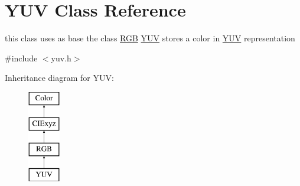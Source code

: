 \hypertarget{class_y_u_v}{}\section{Y\+UV Class Reference}
\label{class_y_u_v}


this class uses as base the class \hyperlink{class_r_g_b}{R\+GB} \hyperlink{class_y_u_v}{Y\+UV} stores a color in \hyperlink{class_y_u_v}{Y\+UV} representation  




{\ttfamily \#include $<$yuv.\+h$>$}

Inheritance diagram for Y\+UV\+:\begin{figure}[H]
\begin{center}
\leavevmode
\includegraphics[height=4.000000cm]{class_y_u_v}
\end{center}
\end{figure}
